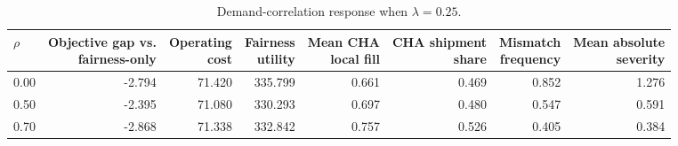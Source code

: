 \begin{table}[!ht]
    \centering
    \small
    \setlength{\tabcolsep}{4pt}
    \renewcommand{\arraystretch}{1.12}
    \caption{Demand-correlation response when $\lambda=0.25$.}
    \label{tab:demand_correlation_summary}
    \begin{tabular}{lrrrrrrr}
    \toprule
    $\rho$ & \makecell{Objective gap vs.\\fairness-only} & \makecell{Operating\\cost} & \makecell{Fairness\\utility} & \makecell{Mean CHA\\local fill} & \makecell{CHA shipment\\share} & \makecell{Mismatch\\frequency} & \makecell{Mean absolute\\severity} \\
    \midrule
    0.00 & -2.794 & 71.420 & 335.799 & 0.661 & 0.469 & 0.852 & 1.276 \\
    0.50 & -2.395 & 71.080 & 330.293 & 0.697 & 0.480 & 0.547 & 0.591 \\
    0.70 & -2.868 & 71.338 & 332.842 & 0.757 & 0.526 & 0.405 & 0.384 \\
    \bottomrule
    \end{tabular}
\end{table}

